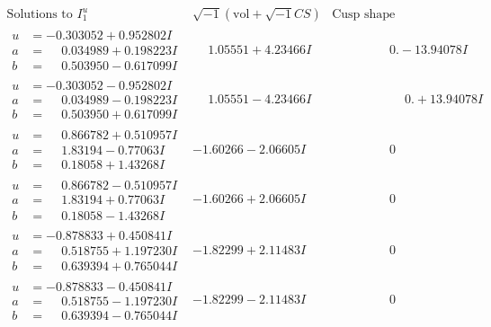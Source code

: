 \documentclass[1p]{elsarticle_modified}
\theoremstyle{definition}
\newcommand{\I}{\sqrt{-1}}
\begin{document}
$$\begin{array}{c|c|c}  
\text{Solutions to }I^u_{1}& \I (\text{vol} + \sqrt{-1}CS) & \text{Cusp shape}\\
 \hline 
\begin{aligned}
u &= -0.303052 + 0.952802 I \\
a &= \phantom{-}0.034989 + 0.198223 I \\
b &= \phantom{-}0.503950 - 0.617099 I\end{aligned}
 & \phantom{-}1.05551 + 4.23466 I & \phantom{-0.000000 } 0. - 13.94078 I \\ \hline\begin{aligned}
u &= -0.303052 - 0.952802 I \\
a &= \phantom{-}0.034989 - 0.198223 I \\
b &= \phantom{-}0.503950 + 0.617099 I\end{aligned}
 & \phantom{-}1.05551 - 4.23466 I & \phantom{-0.000000 -}0. + 13.94078 I \\ \hline\begin{aligned}
u &= \phantom{-}0.866782 + 0.510957 I \\
a &= \phantom{-}1.83194 - 0.77063 I \\
b &= \phantom{-}0.18058 + 1.43268 I\end{aligned}
 & -1.60266 - 2.06605 I & \phantom{-0.000000 } 0 \\ \hline\begin{aligned}
u &= \phantom{-}0.866782 - 0.510957 I \\
a &= \phantom{-}1.83194 + 0.77063 I \\
b &= \phantom{-}0.18058 - 1.43268 I\end{aligned}
 & -1.60266 + 2.06605 I & \phantom{-0.000000 } 0 \\ \hline\begin{aligned}
u &= -0.878833 + 0.450841 I \\
a &= \phantom{-}0.518755 + 1.197230 I \\
b &= \phantom{-}0.639394 + 0.765044 I\end{aligned}
 & -1.82299 + 2.11483 I & \phantom{-0.000000 } 0 \\ \hline\begin{aligned}
u &= -0.878833 - 0.450841 I \\
a &= \phantom{-}0.518755 - 1.197230 I \\
b &= \phantom{-}0.639394 - 0.765044 I\end{aligned}
 & -1.82299 - 2.11483 I & \phantom{-0.000000 } 0 \\ \hline\begin{aligned}

\end{aligned}
\end{array}$$
\end{document}
